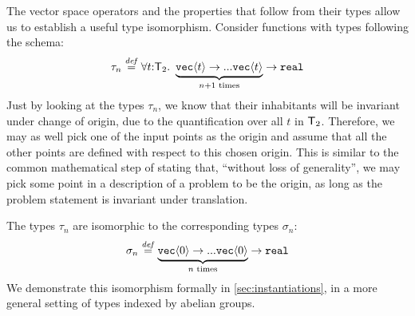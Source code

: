 
\begin{example}
  The vector space operators and the properties that follow from their
  types allow us to establish a useful type isomorphism. Consider
  functions with types following the schema:
  \begin{displaymath}
    \tau_{n} \stackrel{\mathit{def}}= \forall t\mathord:\mathsf{T}_2.\ \underbrace{\texttt{vec}\langle t \rangle \to ... \texttt{vec}\langle t \rangle}_{n+1\textrm{ times}} \to \texttt{real}
  \end{displaymath}
  Just by looking at the types $\tau_{n}$, we know that their
  inhabitants will be invariant under change of origin, due to the
  quantification over all $t$ in $\mathsf{T}_2$. Therefore, we may as well pick
  one of the input points as the origin and assume that all the other
  points are defined with respect to this chosen origin. This is
  similar to the common mathematical step of stating that, ``without
  loss of generality'', we may pick some point in a description of a
  problem to be the origin, as long as the problem statement is
  invariant under translation.

  The types $\tau_{n}$ are isomorphic to the corresponding types
  $\sigma_{n}$:
  \begin{displaymath}
    \sigma_{n} \stackrel{\mathit{def}}= \underbrace{\texttt{vec}\langle 0 \rangle \to ... \texttt{vec}\langle 0 \rangle}_{n\textrm{ times}} \to \texttt{real}
  \end{displaymath}
  We demonstrate this isomorphism formally in
  \autoref{sec:instantiations}, in a more general setting of types
  indexed by abelian groups.

\end{example}

